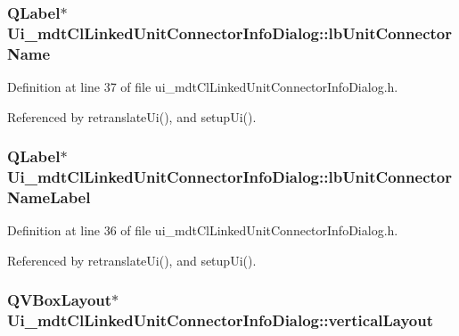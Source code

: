 \hypertarget{class_ui__mdt_cl_linked_unit_connector_info_dialog_a726b2a56d25405b1c4562053c7b60d4f}{
\subsubsection[{lb\-Unit\-Connector\-Name}]{\setlength{\rightskip}{0pt plus 5cm}Q\-Label$\ast$ Ui\-\_\-mdt\-Cl\-Linked\-Unit\-Connector\-Info\-Dialog\-::lb\-Unit\-Connector\-Name}}\label{class_ui__mdt_cl_linked_unit_connector_info_dialog_a726b2a56d25405b1c4562053c7b60d4f}


Definition at line 37 of file ui\-\_\-mdt\-Cl\-Linked\-Unit\-Connector\-Info\-Dialog.\-h.



Referenced by retranslate\-Ui(), and setup\-Ui().

\hypertarget{class_ui__mdt_cl_linked_unit_connector_info_dialog_a1a21797a3a2f53a2d1f139c2226da09f}{
\subsubsection[{lb\-Unit\-Connector\-Name\-Label}]{\setlength{\rightskip}{0pt plus 5cm}Q\-Label$\ast$ Ui\-\_\-mdt\-Cl\-Linked\-Unit\-Connector\-Info\-Dialog\-::lb\-Unit\-Connector\-Name\-Label}}\label{class_ui__mdt_cl_linked_unit_connector_info_dialog_a1a21797a3a2f53a2d1f139c2226da09f}


Definition at line 36 of file ui\-\_\-mdt\-Cl\-Linked\-Unit\-Connector\-Info\-Dialog.\-h.



Referenced by retranslate\-Ui(), and setup\-Ui().

\hypertarget{class_ui__mdt_cl_linked_unit_connector_info_dialog_abf60c0cfcc1c4f0f55f2153043f7f9b8}{
\subsubsection[{vertical\-Layout}]{\setlength{\rightskip}{0pt plus 5cm}Q\-V\-Box\-Layout$\ast$ Ui\-\_\-mdt\-Cl\-Linked\-Unit\-Connector\-Info\-Dialog\-::vertical\-Layout}}\label{class_ui__mdt_cl_linked_unit_connector_info_dialog_abf60c0cfcc1c4f0f55f2153043f7f9b8}


